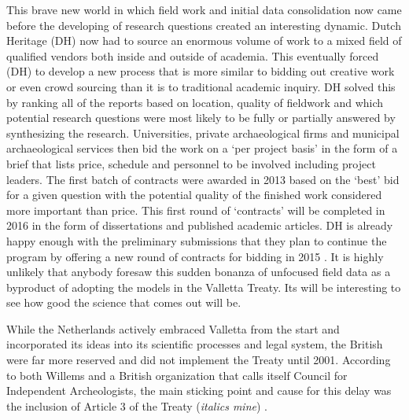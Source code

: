 This brave new world in which field work and initial data consolidation now came before the developing of research questions created an interesting dynamic. Dutch Heritage (DH) now had to source an enormous volume of work to a mixed field of qualified vendors both inside and outside of academia. This eventually forced (DH) to develop a new process that is more similar to bidding out creative work or even crowd sourcing than it is to traditional academic inquiry. DH solved this by ranking all of the reports based on location, quality of fieldwork and which potential research questions were most likely to be fully or partially answered by synthesizing the research. Universities, private archaeological firms and municipal archaeological services then bid the work on a ‘per project basis’ in the form of a brief that lists price, schedule and personnel to be involved including project leaders. 
The first batch of contracts were awarded in 2013 based on the ‘best’ bid for a given question with the potential quality of the finished work considered more important than price. This first round of ‘contracts’ will be completed in 2016 in the form of dissertations and published academic articles. DH is already happy enough with the preliminary submissions that they plan to continue the program by offering a new round of contracts for bidding in 2015 \parencite{Groenewoudt_2014}. 
It is highly unlikely that anybody foresaw this sudden bonanza of unfocused field data as a byproduct of adopting the models in the Valletta Treaty. Its will be interesting to see how good the science that comes out will be. 


While the Netherlands actively embraced Valletta from the start and incorporated its ideas into its scientific processes and legal system, the British were far more reserved and did not implement the Treaty until 2001. According to both Willems and a British organization that calls itself Council for Independent Archeologists, the main sticking point and cause for this delay was the inclusion of Article 3 of the Treaty (\textit{italics mine}) \parencites[62]{Willems_2007}{CIA_2001}. 


